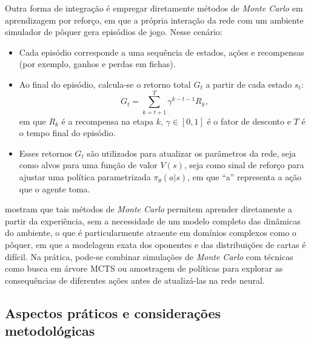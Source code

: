Outra forma de integração é empregar diretamente métodos de \textit{Monte Carlo} em aprendizagem por reforço, em que a própria interação da rede com um ambiente simulador de pôquer gera episódios de jogo. Nesse cenário:
\begin{itemize}
      \item Cada episódio corresponde a uma sequência de estados, ações e recompensas (por exemplo, ganhos e perdas em fichas).
      \item Ao final do episódio, calcula-se o retorno total \(G_t\) a partir de cada estado \(s_t\):
            $$G_t = \sum_{k=t+1}^{T} \gamma^{k-t-1} R_k,$$
            em que \(R_k\) é a recompensa na etapa \(k\), \(\gamma \in [0, 1]\) é o fator de desconto e \(T\) é o tempo final do episódio.
      \item Esses retornos \(G_t\) são utilizados para atualizar os parâmetros da rede, seja como alvos para uma função de valor \(V(s)\), seja como sinal de reforço para ajustar uma política parametrizada \(\pi_\theta(a|s)\), em que ``a'' representa a ação que o agente toma.
\end{itemize}
 mostram que tais métodos de \textit{Monte Carlo} permitem aprender diretamente a partir da experiência, sem a necessidade de um modelo completo das dinâmicas do ambiente, o que é particularmente atraente em domínios complexos como o pôquer, em que a modelagem exata dos oponentes e das distribuições de cartas é difícil. Na prática, pode-se combinar simulações de \textit{Monte Carlo} com técnicas como busca em árvore \gls{MCTS} ou amostragem de políticas para explorar as consequências de diferentes ações antes de atualizá-las na rede neural.

\subsection{Aspectos práticos e considerações metodológicas}

